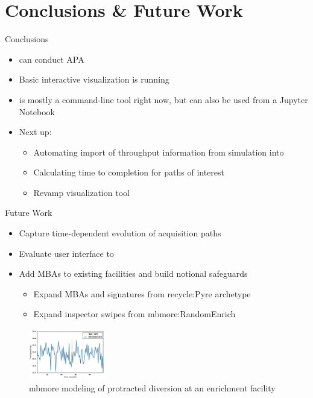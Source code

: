 \section{Conclusions \& Future Work}
\begin{frame}{Conclusions}
    \begin{itemize}
        \item \Trailmap can conduct APA
        \item Basic interactive visualization is running
        \item \Trailmap is mostly a command-line tool right now, but can also be used from a Jupyter Notebook
        \item Next up: 
        \begin{itemize}
            \item Automating import of throughput information from \Cyclus simulation into \Trailmap
            \item Calculating time to completion for paths of interest
            \item Revamp visualization tool
        \end{itemize}
    \end{itemize}
\end{frame}

\begin{frame}{Future Work}
    \begin{itemize}
        \item Capture time-dependent evolution of acquisition paths
        \item Evaluate user interface to \Trailmap
        \item Add MBAs to existing \Cyclus facilities and build notional safeguards
        \begin{itemize}
            \item Expand MBAs and signatures from recycle:Pyre archetype \cite{westphal_modeling_2019}
            \item Expand inspector swipes from mbmore:RandomEnrich\cite{mcgarry_mbmore_2018}
        \end{itemize}
    \end{itemize}
    \begin{figure}
        \centering
        \includegraphics[width=0.3\textwidth]{images/Mcgarry_diversion.png}
        \caption{mbmore modeling of protracted diversion at an enrichment facility}
        \label{fig:McGarry_diversion}
    \end{figure}
\end{frame}
